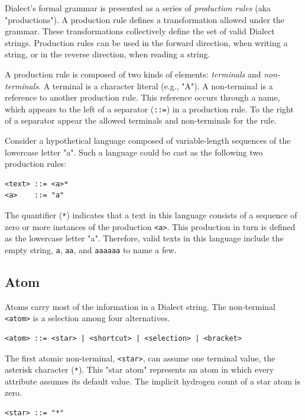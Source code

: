 \documentclass{article}
\def\ttt{\texttt}
\begin{document}
Dialect's formal grammar is presented as a series of \textit{production rules} (aka "productions"). A production rule defines a transformation allowed under the grammar. These transformations collectively define the set of valid Dialect strings. Production rules can be used in the forward direction, when writing a string, or in the reverse direction, when reading a string. 

A production rule is composed of two kinds of elements: \textit{terminals} and \textit{non-terminals}. A terminal is a character literal (e.g., "A"). A non-terminal is a reference to another production rule. This reference occurs through a name, which appears to the left of a separator (\ttt{::=}) in a production rule. To the right of a separator appear the allowed terminals and non-terminals for the rule.

Consider a hypothetical language composed of variable-length sequences of the lowercase letter "a". Such a language could be cast as the following two production rules:

\begin{lstlisting}
<text> ::= <a>*
<a>    ::= "a"
\end{lstlisting}

The quantifier (\ttt{*}) indicates that a text in this language consists of a sequence of zero or more instances of the production \ttt{<a>}. This production in turn is defined as the lowercase letter "a". Therefore, valid texts in this language include the empty string, \ttt{a}, \ttt{aa}, and \ttt{aaaaaa} to name a few.

\subsection*{Atom}

Atoms carry most of the information in a Dialect string. The non-terminal \ttt{<atom>} is a selection among four alternatives.

\begin{lstlisting}
<atom> ::= <star> | <shortcut> | <selection> | <bracket>
\end{lstlisting}

The first atomic non-terminal, \ttt{<star>}, can assume one terminal value, the asterisk character (\ttt{*}). This "star atom" represents an atom in which every attribute assumes its default value. The implicit hydrogen count of a star atom is zero.

\begin{lstlisting}
<star> ::= "*"
\end{lstlisting}
\end{document}
